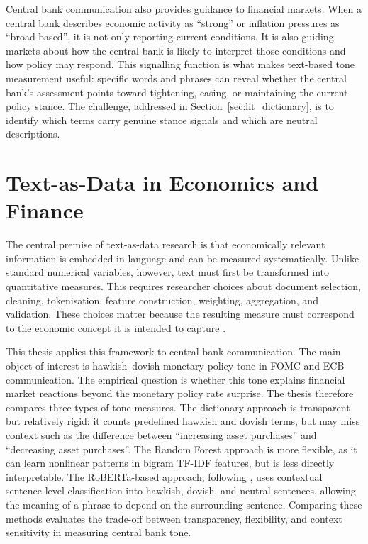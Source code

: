 Central bank communication also provides guidance to financial markets.
When a central bank describes economic activity as ``strong'' or
inflation pressures as ``broad-based'', it is not only reporting current
conditions. It is also guiding markets about how the central bank is
likely to interpret those conditions and how policy may respond. This
signalling function is what makes text-based tone measurement useful:
specific words and phrases can reveal whether the central bank's
assessment points toward tightening, easing, or maintaining the current
policy stance. The challenge, addressed in
Section~\ref{sec:lit_dictionary}, is to identify which terms carry
genuine stance signals and which are neutral descriptions.


\section{Text-as-Data in Economics and Finance}
\label{sec:lit_textasdata}
The central premise of text-as-data research is that economically
relevant information is embedded in language and can be measured
systematically. Unlike standard numerical variables, however, text must
first be transformed into quantitative measures. This requires
researcher choices about document selection, cleaning, tokenisation,
feature construction, weighting, aggregation, and validation. These
choices matter because the resulting measure must correspond to the
economic concept it is intended to capture \citep{gentzkow2019}.

This thesis applies this framework to central bank communication. The
main object of interest is hawkish--dovish monetary-policy tone in FOMC
and ECB communication. The empirical question is whether this tone
explains financial market reactions beyond the monetary policy rate
surprise. The thesis therefore compares three types of tone measures.
The dictionary approach is transparent but relatively rigid: it counts
predefined hawkish and dovish terms, but may miss context such as the
difference between ``increasing asset purchases'' and ``decreasing asset
purchases''. The Random Forest approach is more flexible, as it can learn
nonlinear patterns in bigram TF-IDF features, but is less directly
interpretable. The RoBERTa-based approach, following \citet{shah2023},
uses contextual sentence-level classification into hawkish, dovish, and
neutral sentences, allowing the meaning of a phrase to depend on the
surrounding sentence. Comparing these methods evaluates the trade-off
between transparency, flexibility, and context sensitivity in measuring
central bank tone.

